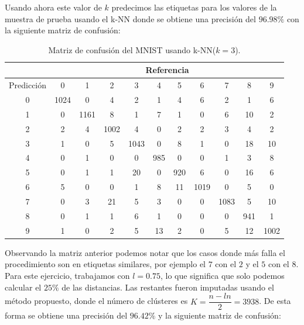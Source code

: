 \documentclass[12pt]{report} %
\theoremstyle{definition}
\begin{document}
{Usando ahora este valor de $k$ predecimos las etiquetas para los valores de la muestra de prueba usando el k-NN donde se obtiene una precisión del $96.98\%$ con la siguiente matriz de confusión:

\begin{table}[H]
	\centering
	\caption{Matriz de confusión del MNIST usando k-NN($k=3$).}
	\label{tab:confussion matrix mnsit}
	\begin{tabular}{|c|c|c|c|c|c|c|c|c|c|c|}
		\hline
		& \multicolumn{10}{c|}{Referencia}                                 \\ \hline
		Predicción & 0    & 1    & 2    & 3    & 4   & 5   & 6    & 7    & 8   & 9    \\ \hline
		0          & 1024 & 0    & 4    & 2    & 1   & 4   & 6    & 2    & 1   & 6    \\ \hline
		1          & 0    & 1161 & 8    & 1    & 7   & 1   & 0    & 6    & 10  & 2    \\ \hline
		2          & 2    & 4    & 1002 & 4    & 0   & 2   & 2    & 3    & 4   & 2    \\ \hline
		3          & 1    & 0    & 5    & 1043 & 0   & 8   & 1    & 0    & 18  & 10   \\ \hline
		4          & 0    & 1    & 0    & 0    & 985 & 0   & 0    & 1    & 3   & 8    \\ \hline
		5          & 0    & 1    & 1    & 20   & 0   & 920 & 6    & 0    & 16  & 6    \\ \hline
		6          & 5    & 0    & 0    & 1    & 8   & 11  & 1019 & 0    & 5   & 0    \\ \hline
		7          & 0    & 3    & 21   & 5    & 3   & 0   & 0    & 1083 & 5   & 10   \\ \hline
		8          & 0    & 1    & 1    & 6    & 1   & 0   & 0    & 0    & 941 & 1    \\ \hline
		9          & 1    & 0    & 2    & 5    & 13  & 2   & 0    & 5    & 12  & 1002 \\ \hline
	\end{tabular}
\end{table}

Observando la matriz anterior podemos notar que los casos donde más falla el procedimiento son en etiquetas similares, por ejemplo el $7$ con el $2$ y el $5$ con el $8$.\\

Para este ejercicio, trabajamos con $l = 0.75$, lo que significa que solo podemos calcular el $25\%$ de las distancias. Las restantes fueron imputadas usando el método propuesto, donde el número de clústeres es $K = \dfrac{n-ln}{2} = 3938$. De esta forma se obtiene una precisión del $96.42\%$ y la siguiente matriz de confusión:

}
\end{document}
